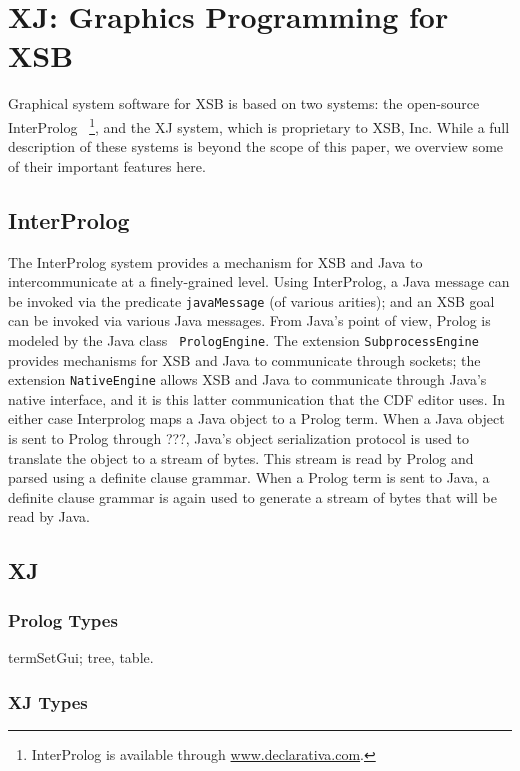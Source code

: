 \chapter{XJ: Graphics Programming for XSB}

Graphical system software for XSB is based on two systems: the
open-source InterProlog \cite{Cale01}~\footnote{InterProlog is
available through \url{www.declarativa.com}.}, and the XJ system,
which is proprietary to XSB, Inc.  While a full description of these
systems is beyond the scope of this paper, we overview some of their
important features here.

\section{InterProlog}

The InterProlog system provides a mechanism for XSB and Java to
intercommunicate at a finely-grained level.  Using InterProlog, a Java
message can be invoked via the predicate {\tt javaMessage} (of various
arities); and an XSB goal can be invoked via various Java messages.
From Java's point of view, Prolog is modeled by the Java class {\tt
PrologEngine}.  The extension {\tt SubprocessEngine} provides
mechanisms for XSB and Java to communicate through sockets; the
extension {\tt NativeEngine} allows XSB and Java to communicate
through Java's native interface, and it is this latter communication
that the CDF editor uses.  In either case Interprolog maps a Java
object to a Prolog term.  When a Java object is sent to Prolog {\sc
through ???}, Java's object serialization protocol is used to
translate the object to a stream of bytes.  This stream is read by
Prolog and parsed using a definite clause grammar.  When a Prolog term
is sent to Java, a definite clause grammar is again used to generate a
stream of bytes that will be read by Java.

\section{XJ}

\subsection{Prolog Types}

termSetGui; tree, table.

\subsection{XJ Types}

